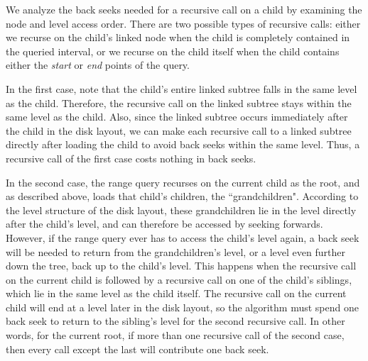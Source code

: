 \documentclass[11pt, oneside]{article}
\newcommand{\ms}{\textit}
\begin{document}
We analyze the back seeks needed for a recursive call on a child by examining
the node and level access order. There are two possible types of recursive
calls: either we recurse on the child's linked node when the child is
completely contained in the queried interval, or we recurse on the child itself
when the child contains either the \ms{start} or \ms{end} points of the query. 

In the first case, note that the child's entire linked subtree falls in the
same level as the child. Therefore, the recursive call on the linked subtree
stays within the same level as the child. Also, since the linked subtree occurs
immediately after the child in the disk layout, we can make each recursive call
to a linked subtree directly after loading the child to avoid back seeks within
the same level. Thus, a recursive call of the first case costs nothing in back
seeks.

In the second case, the range query recurses on the current child as the root,
and as described above, loads that child's children, the ``grandchildren".
According to the level structure of the disk layout, these grandchildren lie in
the level directly after the child's level, and can therefore be accessed by
seeking forwards. However, if the range query ever has to access the child's
level again, a back seek will be needed to return from the grandchildren's
level, or a level even further down the tree, back up to the child's level.
This happens when the recursive call on the current child is followed by a
recursive call on one of the child's siblings, which lie in the same level as
the child itself. The recursive call on the current child will end at a level
later in the disk layout, so the algorithm must spend one back seek to return
to the sibling's level for the second recursive call. In other words, for the
current root, if more than one recursive call of the second case, then every
call except the last will contribute one back seek. 
\end{document}

